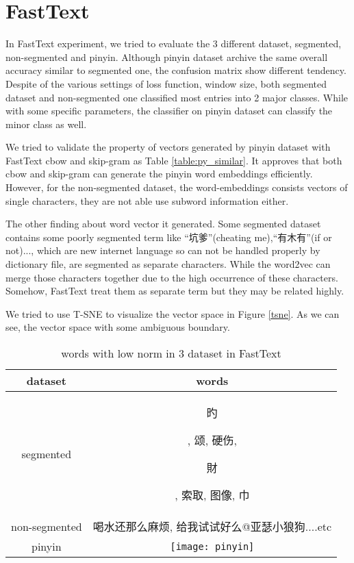 \section{FastText}

In FastText experiment, we tried to evaluate the 3 different dataset, segmented, non-segmented and pinyin. 
Although pinyin dataset archive the same overall accuracy similar to segmented one, the confusion matrix show different tendency.
Despite of the various settings of loss function, window size, both segmented dataset and non-segmented one classified most entries into 2 major classes.
While with some specific parameters, the classifier on pinyin dataset can classify the minor class as well. 

We tried to validate the property of vectors generated by pinyin dataset with FastText cbow and skip-gram as Table \ref{table:py_similar}. 
It approves that both cbow and skip-gram can generate the pinyin word embeddings efficiently. 
However, for the non-segmented dataset, the word-embeddings consists vectors of single characters, they are not able use subword information either.

The other finding about word vector it generated. 
Some segmented dataset contains some poorly segmented term like \enquote{坑爹}(cheating me),\enquote{有木有}(if or not)..., which are new internet language so can not be handled properly by dictionary file, are segmented as separate characters.  
While the word2vec can merge those characters together due to the high occurrence of these characters. 
Somehow, FastText treat them as separate term but they may be related highly.

We tried to use T-SNE to visualize the vector space in Figure \ref{tsne}. As we can see, the vector space with some ambiguous boundary.


\begin{CJK}{UTF8}{gbsn}
\begin{table}[]
\centering
\caption{words with low norm in 3 dataset in FastText}
\label{table:lownorm}
\begin{tabular}{|c|c|}
\hline
 dataset  & words  \\
\hline
segmented  & \begin{CJK}{UTF8}{bkai} 旳\end{CJK}, 颂, 硬伤, \begin{CJK}{UTF8}{bkai}財\end{CJK}, 索取, 图像, 巾 \\
non-segmented  & 喝水还那么麻烦, 给我试试好么@亚瑟小狼狗....etc   \\
pinyin     &         \texttt{[image: pinyin]} \\   
\hline
\end{tabular}
\end{table}
\end{CJK}

